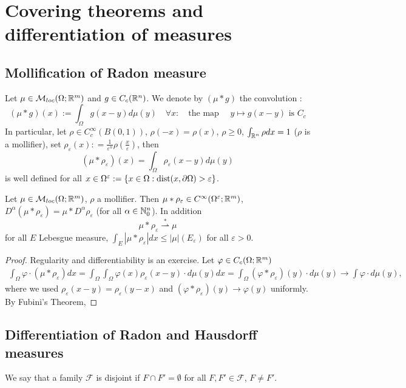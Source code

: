 \newcommand{\weakstar}{\overset{*}{\rightharpoonup}}
\section{Covering theorems and differentiation of measures}
\subsection{Mollification of Radon measure}

Let $\mu \in \mathcal{M}_{loc}(\Omega;\mathbb{R}^m)$ and $g \in C_c(\mathbb{R}^n)$.
We denote by $(\mu * g)$ the convolution :
\[
(\mu * g)(x) := \int_\Omega g(x-y) d\mu(y)
\quad \forall x:
\quad \text{the map $\quad y \mapsto g(x-y)$ is $C_c$}
\]
In particular, let $\rho \in C^\infty_c (B(0,1))$, $\rho(-x)= \rho(x)$, $\rho
\geq 0$, $\int_{\mathbb{R}^n} \rho dx  = 1$ ($\rho$ is a mollifier), set
$\rho_\varepsilon(x) : = \frac{1}{\varepsilon^n} \rho(\frac{x}{\varepsilon})$,
then  
\[
(\mu * \rho_\varepsilon)(x) = \int_\Omega \rho_\varepsilon(x-y) d\mu(y)
\]
is well defined for all $x \in \Omega^\varepsilon := \{x \in \Omega:
\operatorname{dist}(x,\partial \Omega) > \varepsilon\}$. 

\begin{theorem}
Let $\mu \in \mathcal{M}_{loc}(\Omega;\mathbb{R}^m)$, $\rho$ a mollifier. Then $\mu *
\rho_\varepsilon \in C^\infty(\Omega^\varepsilon;\mathbb{R}^m)$, $D^\alpha(\mu *
\rho_\varepsilon) = \mu * D^\alpha \rho_\varepsilon$ (for all $\alpha \in
\mathbb{N}_0^n$). In addition
\[
\mu * \rho_\varepsilon \weakstar \mu 
\]
for all $E$ Lebesgue measure, $\int_E |\mu * \rho_\varepsilon|dx \leq
	|\mu|(E_\varepsilon)$ for all $\varepsilon >0$.
\end{theorem}
\begin{proof}
Regularity and differentiability is an exercise.
Let $\varphi \in C_c(\Omega;\mathbb{R}^m)$
\[
\begin{aligned}
\int_\Omega \varphi \cdot (\mu * \rho_\varepsilon) dx 
= \int_\Omega \int_\Omega \varphi(x) \rho_\varepsilon(x-y) \cdot d\mu(y) dx 
= \int_\Omega (\varphi * \rho_\varepsilon)(y) \cdot d\mu(y) \to \int \varphi
\cdot d\mu(y),
\end{aligned}
\]
where we used $\rho_\varepsilon(x-y) = \rho_\varepsilon(y-x)$ and
$(\varphi*\rho_\varepsilon)(y) \to \varphi(y)$ uniformly.
By Fubini's Theorem,
\TODO
\end{proof}

\subsection{Differentiation of Radon and Hausdorff measures}
We say that a family $\mathcal{F}$ is disjoint if $F \cap F' = \emptyset$ for
all $F,F' \in \mathcal{F}$, $F \neq F'$.

